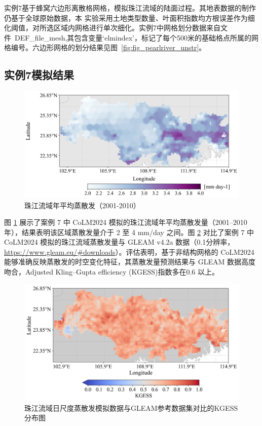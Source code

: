 实例7基于蜂窝六边形离散格网格，模拟珠江流域的陆面过程。其地表数据的制作仍基于全球原始数据，本
实验采用土地类型数量、叶面积指数均方根误差作为细化阈值，对所选区域内网格进行单次细化。实例7中网格划分数据来自文件~DEF\_file\_mesh,其包含变量`elmindex'，标记了每个500米的基础格点所属的网格编号。六边形网格的划分结果见图~\ref{fig:fig_pearlriver_unstr}。


\subsection{实例7模拟结果}


\begin{figure}[htpb]
    \centering
    \includegraphics[width=\textwidth]{figures/Example07_PearlRiver_unstr_ET_mean.jpg}
    \caption{珠江流域年平均蒸散发（2001-2010）}
    \label{fig:fig_pearlriver_et}
\end{figure}


图 \ref{fig:fig_pearlriver_et} 展示了案例 7 中 CoLM2024 模拟的珠江流域年平均蒸散发量（2001--2010 年），结果表明该区域蒸散发量介于 2 至 4 mm/day 之间。图 \ref{fig:fig_pearlriver_et_eva} 对比了案例 7 中 CoLM2024 模拟的珠江流域蒸散发量与 GLEAM v4.2a 数据（0.1\textdegree 分辨率，\url{https://www.gleam.eu/\#downloads}）。评估表明，基于非结构网格的 CoLM2024 能够准确反映蒸散发的时空变化特征，其蒸散发量预测结果与 GLEAM 数据高度吻合，Adjusted Kling–Gupta efficiency (KGESS)指数多在0.6 以上。

\begin{figure}[htpb]
    \centering
    \includegraphics[width=\textwidth]{figures/Example07_PearlRiver_unstr_ET_KGESS.jpg}
    \caption{珠江流域日尺度蒸散发模拟数据与GLEAM参考数据集对比的KGESS分布图}
    \label{fig:fig_pearlriver_et_eva}
\end{figure}



